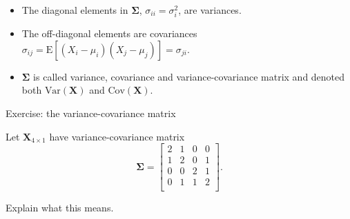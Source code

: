 \documentclass[
  ignorenonframetext,
]{beamer}
\begin{document}
\begin{frame}
\begin{itemize}
\item
  The diagonal elements in \(\boldsymbol\Sigma\),
  \(\sigma_{ii}=\sigma_i^2\), are variances.
\item
  The off-diagonal elements are covariances
  \(\sigma_{ij}=\text{E}[(X_i-\mu_i)(X_j-\mu_j)]=\sigma_{ji}\).
\item
  \(\boldsymbol\Sigma\) is called variance, covariance and
  variance-covariance matrix and denoted both
  \(\text{Var}(\boldsymbol{X})\) and \(\text{Cov}(\boldsymbol{X})\).
\end{itemize}
\end{frame}

\begin{frame}
\begin{block}{Exercise: the variance-covariance matrix}
\protect\hypertarget{exercise-the-variance-covariance-matrix}{}
\vspace{2mm}

Let \(\boldsymbol{X}_{4\times 1}\) have variance-covariance matrix
\[\boldsymbol\Sigma= \left[ \begin{array}{cccc} 2&1&0&0\\
      1&2&0&1\\
      0&0&2&1\\
      0&1&1&2\\
          \end{array}
          \right].\]

Explain what this means.
\end{block}
\end{frame}
\end{document}
